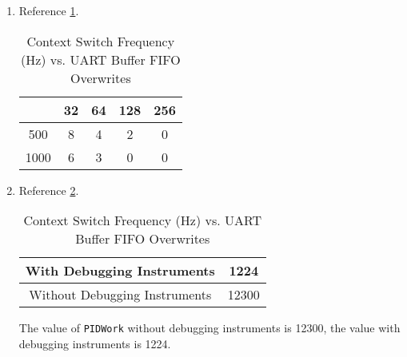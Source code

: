 \documentclass[12pt]{article}
\begin{document}
\begin{enumerate}
\item  Reference \cref{tab:fifo-perf}.
  \begin{table}[h]
    \centering
    \begin{tabular}[H]{c|c|c|c|c}
           & 32 & 64 & 128 & 256 \\ \hline
      500  & 8  & 4  & 2   & 0   \\ \hline
      1000 & 6  & 3  & 0   & 0   \\ \hline
    \end{tabular}
    \caption{Context Switch Frequency (Hz) vs. UART Buffer FIFO Overwrites}
    \label{tab:fifo-perf}
  \end{table}
\item Reference \cref{tab:debugging-instruments-perf}.
  \begin{table}[h]
    \centering
    \begin{tabular}[H]{c|c}
      With Debugging Instruments & 1224 \\ \hline
      Without Debugging Instruments & 12300 \\
    \end{tabular}
    \caption{Context Switch Frequency (Hz) vs. UART Buffer FIFO Overwrites}
    \label{tab:debugging-instruments-perf}
  \end{table}
  The value of \verb|PIDWork| without debugging instruments is
    12300, the value with debugging instruments is 1224.
\end{enumerate}
\end{document}
